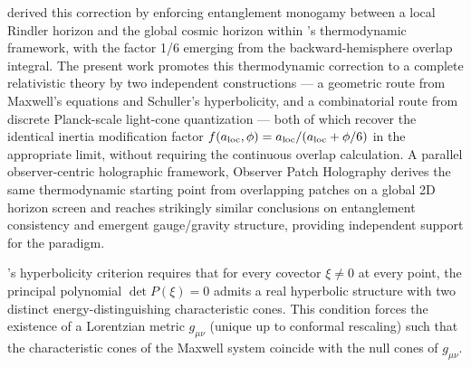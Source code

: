 \documentclass[12pt,a4paper]{article}
\begin{document}
\citet{brodie2026} derived this correction by enforcing entanglement monogamy between a local Rindler horizon and the global cosmic horizon within \citet{Jacobson1995}'s thermodynamic framework, with the factor 1/6 emerging from the backward-hemisphere overlap integral. The present work promotes this thermodynamic correction to a complete relativistic theory by two independent constructions — a geometric route from Maxwell's equations and Schuller's hyperbolicity, and a combinatorial route from discrete Planck-scale light-cone quantization — both of which recover the identical inertia modification factor $f(a_{\rm loc},\phi) = a_{\rm loc}/(a_{\rm loc} + \phi/6)$ in the appropriate limit, without requiring the continuous overlap calculation. A parallel observer-centric holographic framework, Observer Patch Holography \citep{mueller2026} derives the same thermodynamic starting point from overlapping patches on a global 2D horizon screen and reaches strikingly similar conclusions on entanglement consistency and emergent gauge/gravity structure, providing independent support for the paradigm.

\citet{Schuller2020}'s hyperbolicity criterion requires that for every covector $\xi \neq 0$ at every point, the principal polynomial $\det P(\xi)=0$ admits a real hyperbolic structure with two distinct energy-distinguishing characteristic cones. This condition forces the existence of a Lorentzian metric $g_{\mu\nu}$ (unique up to conformal rescaling) such that the characteristic cones of the Maxwell system coincide with the null cones of $g_{\mu\nu}$.
\end{document}
